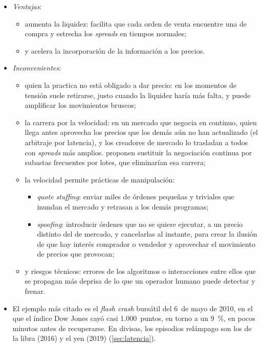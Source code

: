 \documentclass[11pt]{article}
\begin{document}
\begin{itemize}
\item \emph{Ventajas}:
  \begin{itemize}
  \item aumenta la liquidez: facilita que cada orden de venta encuentre una de compra y estrecha los \emph{spreads} en tiempos normales\nocite{BIS2011HFT};
  \item y acelera la incorporación de la información a los precios\nocite{BIS2011HFT}.
  \end{itemize}
\item \emph{Inconvenientes}:
  \begin{itemize}
  \item quien la practica no está obligado a dar precio: en los momentos de tensión suele retirarse, justo cuando la liquidez haría más falta, y puede amplificar los movimientos bruscos\nocite{BIS2011HFT,BIS2020Algos};
  \item la carrera por la velocidad: en un mercado que negocia en continuo, quien llega antes aprovecha los precios que los demás aún no han actualizado (el arbitraje por latencia), y los creadores de mercado lo trasladan a todos con \emph{spreads} más amplios. \textcite{BudishCramtonShim2015} proponen sustituir la negociación continua por subastas frecuentes por lotes, que eliminarían esa carrera;
  \item la velocidad permite prácticas de manipulación:
    \begin{itemize}
    \item \emph{quote stuffing}: enviar miles de órdenes pequeñas y triviales que inundan el mercado y retrasan a los demás programas;
    \item \emph{spoofing}: introducir órdenes que no se quiere ejecutar, a un precio distinto del de mercado, y cancelarlas al instante, para crear la ilusión de que hay interés comprador o vendedor y aprovechar el movimiento de precios que provocan;
    \end{itemize}
  \item y riesgos técnicos: errores de los algoritmos o interacciones entre ellos que se propagan más deprisa de lo que un operador humano puede detectar y frenar\nocite{BIS2020Algos}.
  \end{itemize}
\item El ejemplo más citado es el \emph{flash crash} bursátil del 6~de mayo de 2010, en el que el índice Dow Jones cayó casi 1.000~puntos, en torno a un 9~\%, en pocos minutos antes de recuperarse\nocite{SECCFTC2010}. En divisas, los episodios relámpago son los de la libra (2016) y el yen (2019) (\ref{sec:latencia}).
\end{itemize}
\end{document}
